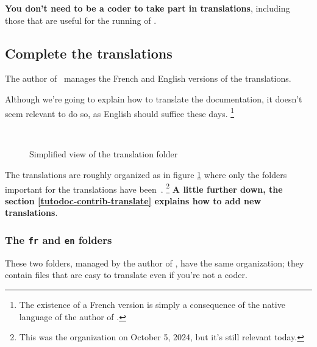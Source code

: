 \begin{tdocnote}
    \textbf{You don't need to be a coder to take part in translations}, including those that are useful for the running of \thisproj.
\end{tdocnote}



\subsection{Complete the translations}

\begin{tdocnote}
    The author of \thisproj\ manages the French and English versions of the translations.
\end{tdocnote}


\begin{tdoccaut}
    Although we're going to explain how to translate the documentation, it doesn't seem relevant to do so, as English should suffice these days.%
    \footnote{
      The existence of a French version is simply a consequence of the native language of the author of \thisproj.
    }
\end{tdoccaut}


\begin{figure}[ht]
    \centering
    \contribtranslatedirtree\
    \caption{Simplified view of the translation folder}
    \label{tutodoc-contrib-translate-dir}
\end{figure}


The translations are roughly organized as in figure \ref{tutodoc-contrib-translate-dir} where only the folders important for the translations have been \,.%
\footnote{
    This was the organization on October 5, 2024, but it's still relevant today.
}
\textbf{A little further down, the section \ref{tutodoc-contrib-translate} explains how to add new translations}.


\subsubsection{The \texttt{fr} and \texttt{en} folders}

These two folders, managed by the author of \thisproj, have the same organization; they contain files that are easy to translate even if you're not a coder.


